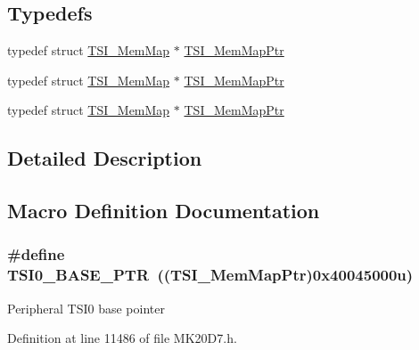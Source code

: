 \subsection*{Typedefs}
\begin{DoxyCompactItemize}
\item 
typedef struct \hyperlink{struct_t_s_i___mem_map}{T\+S\+I\+\_\+\+Mem\+Map} $\ast$ \hyperlink{group___t_s_i___peripheral_gad1310fedc6b594554cdd760e371de570}{T\+S\+I\+\_\+\+Mem\+Map\+Ptr}
\item 
typedef struct \hyperlink{struct_t_s_i___mem_map}{T\+S\+I\+\_\+\+Mem\+Map} $\ast$ \hyperlink{group___t_s_i___peripheral_gad1310fedc6b594554cdd760e371de570}{T\+S\+I\+\_\+\+Mem\+Map\+Ptr}
\item 
typedef struct \hyperlink{struct_t_s_i___mem_map}{T\+S\+I\+\_\+\+Mem\+Map} $\ast$ \hyperlink{group___t_s_i___peripheral_gad1310fedc6b594554cdd760e371de570}{T\+S\+I\+\_\+\+Mem\+Map\+Ptr}
\end{DoxyCompactItemize}


\subsection{Detailed Description}


\subsection{Macro Definition Documentation}
\subsubsection[{\texorpdfstring{T\+S\+I0\+\_\+\+B\+A\+S\+E\+\_\+\+P\+TR}{TSI0_BASE_PTR}}]{\setlength{\rightskip}{0pt plus 5cm}\#define T\+S\+I0\+\_\+\+B\+A\+S\+E\+\_\+\+P\+TR~(({\bf T\+S\+I\+\_\+\+Mem\+Map\+Ptr})0x40045000u)}\hypertarget{group___t_s_i___peripheral_gaf98ea1cd15559446e0cfc1ae177751f6}{}\label{group___t_s_i___peripheral_gaf98ea1cd15559446e0cfc1ae177751f6}
Peripheral T\+S\+I0 base pointer 

Definition at line 11486 of file M\+K20\+D7.\+h.


